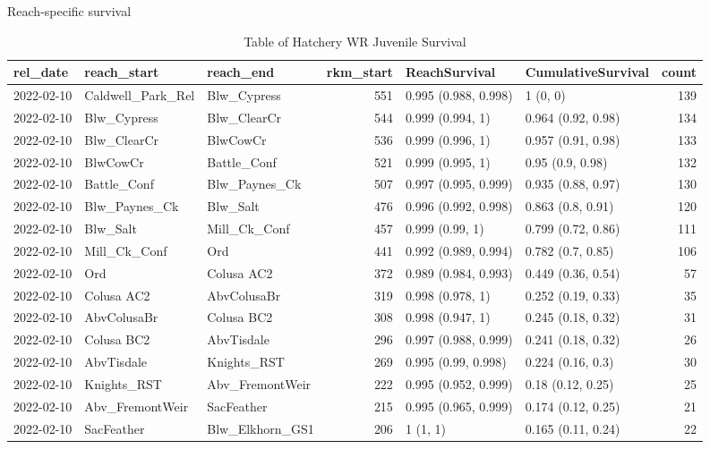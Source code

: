 \documentclass[
]{book}
\theoremstyle{definition}
\theoremstyle{definition}
\theoremstyle{definition}
\theoremstyle{definition}
\theoremstyle{remark}
\begin{document}
Reach-specific survival

\begin{table}
\centering
\caption{Table of Hatchery WR Juvenile Survival}
\centering
\begin{tabular}[t]{lllrllr}
\hline
rel\_date & reach\_start & reach\_end & rkm\_start & ReachSurvival & CumulativeSurvival & count\\
\hline
2022-02-10 & Caldwell\_Park\_Rel & Blw\_Cypress & 551 & 0.995 (0.988, 0.998) & 1 (0, 0) & 139\\
\hline
2022-02-10 & Blw\_Cypress & Blw\_ClearCr & 544 & 0.999 (0.994, 1) & 0.964 (0.92, 0.98) & 134\\
\hline
2022-02-10 & Blw\_ClearCr & BlwCowCr & 536 & 0.999 (0.996, 1) & 0.957 (0.91, 0.98) & 133\\
\hline
2022-02-10 & BlwCowCr & Battle\_Conf & 521 & 0.999 (0.995, 1) & 0.95 (0.9, 0.98) & 132\\
\hline
2022-02-10 & Battle\_Conf & Blw\_Paynes\_Ck & 507 & 0.997 (0.995, 0.999) & 0.935 (0.88, 0.97) & 130\\
\hline
2022-02-10 & Blw\_Paynes\_Ck & Blw\_Salt & 476 & 0.996 (0.992, 0.998) & 0.863 (0.8, 0.91) & 120\\
\hline
2022-02-10 & Blw\_Salt & Mill\_Ck\_Conf & 457 & 0.999 (0.99, 1) & 0.799 (0.72, 0.86) & 111\\
\hline
2022-02-10 & Mill\_Ck\_Conf & Ord & 441 & 0.992 (0.989, 0.994) & 0.782 (0.7, 0.85) & 106\\
\hline
2022-02-10 & Ord & Colusa AC2 & 372 & 0.989 (0.984, 0.993) & 0.449 (0.36, 0.54) & 57\\
\hline
2022-02-10 & Colusa AC2 & AbvColusaBr & 319 & 0.998 (0.978, 1) & 0.252 (0.19, 0.33) & 35\\
\hline
2022-02-10 & AbvColusaBr & Colusa BC2 & 308 & 0.998 (0.947, 1) & 0.245 (0.18, 0.32) & 31\\
\hline
2022-02-10 & Colusa BC2 & AbvTisdale & 296 & 0.997 (0.988, 0.999) & 0.241 (0.18, 0.32) & 26\\
\hline
2022-02-10 & AbvTisdale & Knights\_RST & 269 & 0.995 (0.99, 0.998) & 0.224 (0.16, 0.3) & 30\\
\hline
2022-02-10 & Knights\_RST & Abv\_FremontWeir & 222 & 0.995 (0.952, 0.999) & 0.18 (0.12, 0.25) & 25\\
\hline
2022-02-10 & Abv\_FremontWeir & SacFeather & 215 & 0.995 (0.965, 0.999) & 0.174 (0.12, 0.25) & 21\\
\hline
2022-02-10 & SacFeather & Blw\_Elkhorn\_GS1 & 206 & 1 (1, 1) & 0.165 (0.11, 0.24) & 22\\

\end{tabular}
\end{table}
\end{document}
